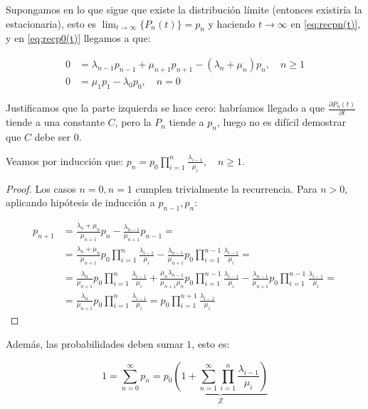 \documentclass[a4paper,10pt]{scrartcl}
\theoremstyle{definition}
\numberwithin{equation}{section}
\begin{document}
Supongamos en lo que sigue que existe la distribución límite (entonces existiría la estacionaria), esto es 
$\lim_{t\rightarrow \infty}\{P_n(t)\} = p_n$ y haciendo $t\rightarrow \infty$ en \eqref{eq:recpn(t)},
y en \eqref{eq:recp0(t)} llegamos a que:

\begin{align*}
0 &= \lambda_{n-1} p_{n-1} + \mu_{n+1} p_{n+1} - (\lambda_n + \mu_n) p_n, \quad n\ge 1\\
0 &= \mu_1 p_1 -\lambda_0 p_0, \quad n=0
\end{align*}

Justificamos que la parte izquierda se hace cero: habríamos llegado a que $\frac{\partial P_n(t)}{\partial t}$ tiende a una constante $C$,
pero la $P_n$ tiende a $p_n$, luego no es difícil demostrar que $C$ debe ser 0.

Veamos por inducción que: $p_n = p_0 \prod_{i=1}^n \frac{\lambda_{i-1}}{\mu_i}, \quad n\ge 1$.

\begin{proof}
 Los casos $n=0, n=1$ cumplen trivialmente la recurrencia. Para $n>0$, aplicando hipótesis de inducción a $p_{n-1}, p_{n}$:
 
 \begin{align*}
 p_{n+1} &= \frac{\lambda_n + \mu_n}{\mu_{n+1}} p_n - \frac{\lambda_{n-1}}{\mu_{n+1}}p_{n-1} = \\
         &= \frac{\lambda_n + \mu_n}{\mu_{n+1}} p_0 \prod_{i=1}^n \frac{\lambda_{i-1}}{\mu_i} - 
            \frac{\lambda_{n-1}}{\mu_{n+1}} p_0 \prod_{i=1}^{n-1} \frac{\lambda_{i-1}}{\mu_i} = \\
         &= \frac{\lambda_n}{\mu_{n+1}} p_0 \prod_{i=1}^n \frac{\lambda_{i-1}}{\mu_i} + 
            \frac{\mu_n \lambda_{n-1}}{\mu_{n+1}\mu_n} p_0 \prod_{i=1}^{n-1} \frac{\lambda_{i-1}}{\mu_i} - 
            \frac{\lambda_{n-1}}{\mu_{n+1}} p_0 \prod_{i=1}^{n-1} \frac{\lambda_{i-1}}{\mu_i} = \\
         &= \frac{\lambda_n}{\mu_{n+1}} p_0 \prod_{i=1}^n \frac{\lambda_{i-1}}{\mu_i} = p_0 \prod_{i=1}^{n+1} \frac{\lambda_{i-1}}{\mu_i}
 \end{align*}
\end{proof}

Además, las probabilidades deben sumar $1$, esto es:

\begin{equation}
1 = \sum_{n=0}^{\infty} p_n = p_0 \underbrace{\left(1 + \sum_{n=1}^{\infty} \prod_{i=1}^n \frac{\lambda_{i-1}}{\mu_i} \right)}_{Z}
\label{eq:stabseries}
\end{equation}
\end{document}
